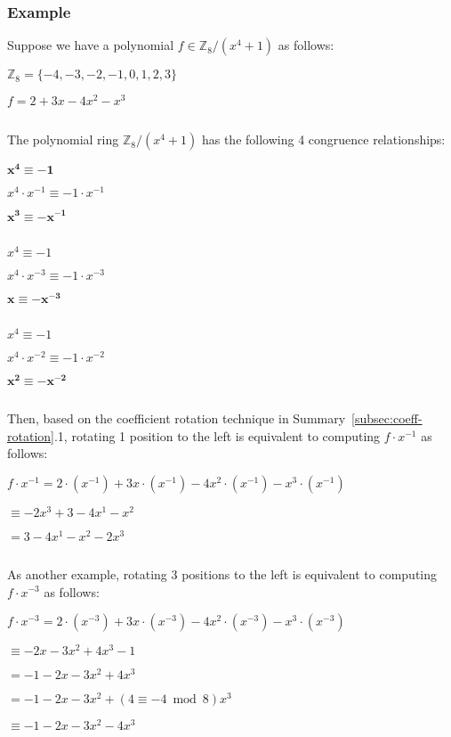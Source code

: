 \subsubsection{Example}
\label{subsec:coeff-rotation-ex}

Suppose we have a polynomial $f \in \mathbb{Z}_8 / (x^4 + 1)$ as follows:

$\mathbb{Z}_8 = \{-4, -3, -2, -1, 0, 1, 2, 3\}$

$f = 2 + 3x - 4x^2 -x^3$




$ $

The polynomial ring $\mathbb{Z}_8 / (x^4 + 1)$ has the following 4  congruence relationships: 

$\mathbf{x^4 \equiv -1}$

$x^4 \cdot x^{-1} \equiv -1 \cdot x^{-1}$

$\mathbf{x^3 \equiv -x^{-1}}$

$ $

$x^4 \equiv -1$

$x^4 \cdot x^{-3} \equiv -1 \cdot x^{-3}$

$\mathbf{x \equiv -x^{-3}}$

$ $

$x^4 \equiv -1$

$x^4 \cdot x^{-2} \equiv -1 \cdot x^{-2}$

$\mathbf{x^2 \equiv -x^{-2}}$

$ $



Then, based on the coefficient rotation technique in Summary~\ref*{subsec:coeff-rotation}.1, rotating 1 position to the left is equivalent to computing $f \cdot x^{-1}$ as follows:

$f\cdot x^{-1} = 2\cdot(x^{-1}) + 3x\cdot(x^{-1}) - 4x^2\cdot(x^{-1}) - x^3\cdot(x^{-1})$

$\equiv -2x^{3} + 3 - 4x^1 - x^2$

$= 3 - 4x^1 - x^2 -2x^{3}$

$ $

As another example, rotating 3 positions to the left is equivalent to computing $f \cdot x^{-3}$ as follows:

$f\cdot x^{-3} = 2\cdot(x^{-3}) + 3x\cdot(x^{-3}) - 4x^2\cdot(x^{-3}) - x^3\cdot(x^{-3})$

$\equiv -2x - 3x^2 + 4x^3 - 1$

$= -1 - 2x - 3x^2 + 4x^3$

$= -1 - 2x - 3x^2 + (4 \equiv -4 \bmod 8) x^3$

$\equiv -1 - 2x - 3x^2 -4x^3$